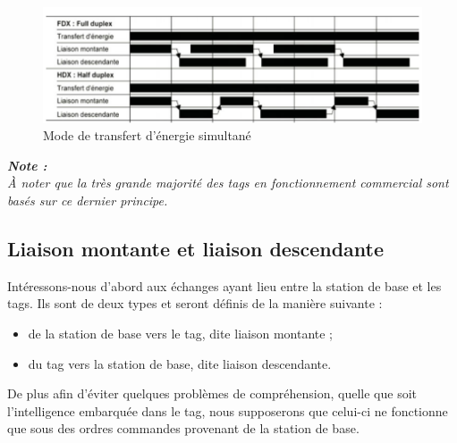 \documentclass[11pt, a4paper, twoside]{book}
\begin{document}
\begin{figure}[H]
\centering
\includegraphics[width=\textwidth]{figb}
\caption{Mode de transfert d'énergie simultané}
\end{figure}

\begin{center}
\textbf{\emph{Note :}}\\
\emph{À noter que la très grande majorité des tags  en fonctionnement commercial sont basés sur ce dernier principe.}
\end{center}

\subsection{Liaison montante et liaison descendante}
Intéressons-nous d’abord aux échanges ayant lieu entre la station de base et les tags. Ils sont de deux types et seront définis  de la manière suivante :
\begin{itemize}
\item de la station de base vers le tag, dite liaison montante ;
\item du tag vers la station de base, dite liaison descendante. \\
\end{itemize}
De plus afin d’éviter quelques problèmes de compréhension, quelle que soit l’intelligence embarquée dans le tag, nous supposerons que celui-ci ne fonctionne que sous des ordres commandes provenant de la station de base. 
\end{document}
